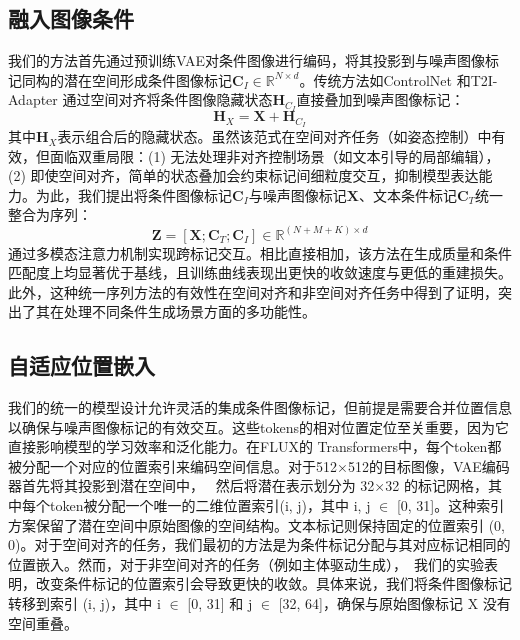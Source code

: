 \subsection{融入图像条件}
我们的方法首先通过预训练VAE对条件图像进行编码，将其投影到与噪声图像标记同构的潜在空间形成条件图像标记$\mathbf{C}_I \in \mathbb{R}^{N \times d}$。传统方法如ControlNet \cite{li2025controlnet}和T2I-Adapter \cite{mou2024t2i}通过空间对齐将条件图像隐藏状态$\mathbf{H}_{C_I}$直接叠加到噪声图像标记：
\begin{equation}
    \mathbf{H}_X = \mathbf{X} + \mathbf{H}_{C_I}
\end{equation}
其中$\mathbf{H}_X$表示组合后的隐藏状态。虽然该范式在空间对齐任务（如姿态控制）中有效，但面临双重局限：(1) 无法处理非对齐控制场景（如文本引导的局部编辑），(2) 即使空间对齐，简单的状态叠加会约束标记间细粒度交互，抑制模型表达能力。为此，我们提出将条件图像标记$\mathbf{C}_I$与噪声图像标记$\mathbf{X}$、文本条件标记$\mathbf{C}_T$统一整合为序列：
\begin{equation}
    \mathbf{Z} = [\mathbf{X}; \mathbf{C}_T; \mathbf{C}_I] \in \mathbb{R}^{(N+M+K) \times d}
\end{equation}
通过多模态注意力机制实现跨标记交互。相比直接相加，该方法在生成质量和条件匹配度上均显著优于基线，且训练曲线表现出更快的收敛速度与更低的重建损失。此外，这种统一序列方法的有效性在空间对齐和非空间对齐任务中得到了证明，突出了其在处理不同条件生成场景方面的多功能性。
\subsection{自适应位置嵌入}
我们的统一的模型设计允许灵活的集成条件图像标记，但前提是需要合并位置信息以确保与噪声图像标记的有效交互。这些tokens的相对位置定位至关重要，因为它直接影响模型的学习效率和泛化能力。在FLUX的 Transformers中，每个token都被分配一个对应的位置索引来编码空间信息。对于512×512的目标图像，VAE编码器首先将其投影到潜在空间中， \
然后将潜在表示划分为 32×32 的标记网格，其中每个token被分配一个唯一的二维位置索引(i, j)，其中 i, j $\in$ [0, 31]。这种索引方案保留了潜在空间中原始图像的空间结构。文本标记则保持固定的位置索引 (0, 0)。对于空间对齐的任务，我们最初的方法是为条件标记分配与其对应标记相同的位置嵌入。然而，对于非空间对齐的任务（例如主体驱动生成），\
我们的实验表明，改变条件标记的位置索引会导致更快的收敛。具体来说，我们将条件图像标记转移到索引 (i, j)，其中 i $\in$ [0, 31] 和 j $\in$ [32, 64]，确保与原始图像标记 X 没有空间重叠。
